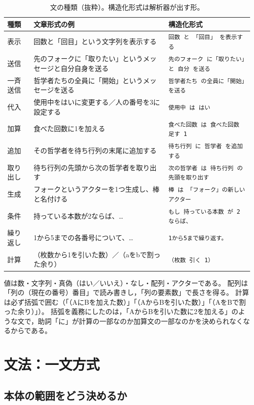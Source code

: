 \documentclass[a4paper,10pt]{ltjsarticle}
\begin{document}
\begin{table}[t]
\centering\small
\caption{文の種類（抜粋）。構造化形式は解析器が出す形。}\label{tab:stmt}
\begin{tabular}{@{}lll@{}}
\toprule
種類 & 文章形式の例 & 構造化形式 \\
\midrule
表示 & 回数と「回目」という文字列を表示する & \verb|回数 と 「回目」 を表示する| \\
送信 & 先のフォークに「取りたい」というメッセージと自分自身を送る & \verb|先のフォーク に「取りたい」と 自分 を送る| \\
一斉送信 & 哲学者たちの全員に「開始」というメッセージを送る & \verb|哲学者たち の全員に「開始」を送る| \\
代入 & 使用中をはいに変更する／人の番号を3に設定する & \verb|使用中 は はい| \\
加算 & 食べた回数に1を加える & \verb|食べた回数 は 食べた回数 足す 1| \\
追加 & その哲学者を待ち行列の末尾に追加する & \verb|待ち行列 に 哲学者 を追加する| \\
取り出し & 待ち行列の先頭から次の哲学者を取り出す & \verb|次の哲学者 は 待ち行列 の先頭を取り出す| \\
生成 & フォークというアクターを1つ生成し、棒と名付ける & \verb|棒 は 「フォーク」の新しいアクター| \\
条件 & 持っている本数が2ならば、… & \verb|もし 持っている本数 が 2 ならば、| \\
繰り返し & 1から5までの各番号について、… & \verb|1から5まで繰り返す。| \\
計算 & （枚数から1を引いた数）／（aをbで割った余り） & \verb|（枚数 引く 1）| \\
\bottomrule
\end{tabular}
\end{table}

値は数・文字列・真偽（はい／いいえ）・なし・配列・アクターである。
配列は「列の（現在の番号）番目」で読み書きし，「列の要素数」で長さを得る。
計算は必ず括弧で囲む（「（AにBを加えた数）」「（AからBを引いた数）」「（AをBで割った余り）」）。
括弧を義務にしたのは，「AからBを引いた数に2を加える」のような文で，助詞「に」が計算の一部なのか加算文の一部なのかを決められなくなるからである。

\section{文法：一文方式}\label{sec:grammar}

\subsection{本体の範囲をどう決めるか}
\end{document}
